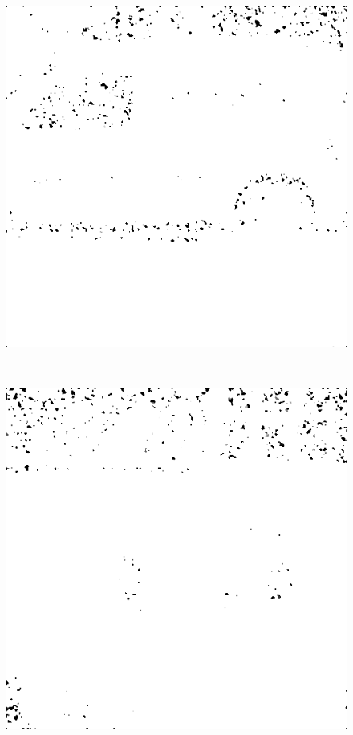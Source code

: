 \begin{figure}[H]
\begin{minipage}[t]{0.3\linewidth}
	\label{fig:sit_m25}
\end{minipage}
\begin{minipage}[t]{0.3\linewidth} %
	\includegraphics[width = 1\linewidth]{gfx/car/car_m30.png}
	\label{fig:car_m30}
\end{minipage}
\begin{minipage}[t]{0.036\linewidth} %
~~~~~
\end{minipage}
\begin{minipage}[t]{0.3\linewidth} %
	\includegraphics[width = 1\linewidth]{gfx/hus/hus_m30.png}

\end{minipage}
\end{figure}
